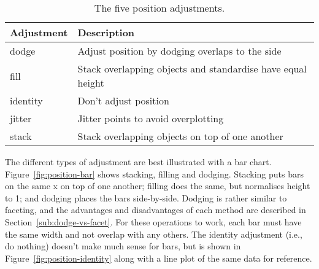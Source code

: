 \begin{table}
  \begin{center}
  \begin{tabular}{ll}
    \toprule
    Adjustment & Description  \\
    \midrule
    dodge     & Adjust position by dodging overlaps to the side \\
    fill      & Stack overlapping objects and standardise have equal height\\
    identity  & Don't adjust position \\
    jitter    & Jitter points to avoid overplotting \\
    stack     & Stack overlapping objects on top of one another \\
    \bottomrule
  \end{tabular}
  \end{center}
  \caption{The five position adjustments.}
  \label{fig:position}
\end{table}

The different types of adjustment are best illustrated with a bar chart.  Figure~\ref{fig:position-bar} shows stacking, filling and dodging.  Stacking puts bars on the same x on top of one another; filling does the same, but normalises height to 1; and dodging places the bars side-by-side.  Dodging is rather similar to faceting, and the advantages and disadvantages of each method are described in Section~\ref{sub:dodge-vs-facet}. For these operations to work, each bar must have the same width and not overlap with any others.  The identity adjustment (i.e., do nothing) doesn't make much sense for bars, but is shown in Figure~\ref{fig:position-identity} along with a line plot of the same data for reference.

% 


% 



